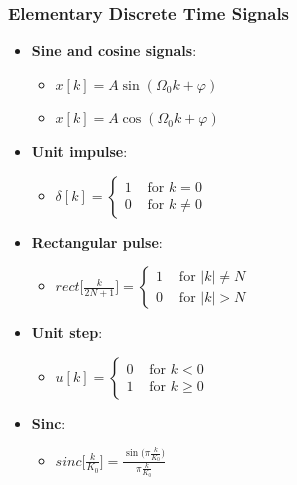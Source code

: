 \documentclass{article}
\begin{document}
\subsubsection{Elementary Discrete Time Signals}
\begin{itemize}
    \item \textbf{Sine and cosine signals}: 
    \begin{itemize}
        \item $x[k] = A\sin(\Omega_0 k + \varphi)$
        \item $x[k] = A\cos(\Omega_0 k + \varphi)$
    \end{itemize}
    \item \textbf{Unit impulse}: 
    \begin{itemize}
        \item $\delta[k] = \left\{\begin{array}{ll} 1 & \text{ for } k=0 \\ 0 & \text{ for } k \neq 0 \end{array}\right.$
    \end{itemize}
    \item \textbf{Rectangular pulse}: 
    \begin{itemize}
        \item $rect\Big[\frac{k}{2N+1}\Big] = \left\{\begin{array}{ll} 1 & \text{ for } |k| \neq N \\ 0 & \text{ for } |k| > N \end{array}\right.$
    \end{itemize}
    \item \textbf{Unit step}: 
    \begin{itemize}
        \item $u[k] = \left\{\begin{array}{ll} 0 & \text{ for } k < 0 \\ 1 & \text{ for } k \geq 0 \end{array}\right.$
    \end{itemize}
    \item \textbf{Sinc}: 
    \begin{itemize}
        \item $sinc\Big[\frac{k}{K_0}\Big] = \frac{\sin\big(\pi\frac{k}{K_0}\big)}{\pi\frac{k}{K_0}}$
    \end{itemize}
\end{itemize}
\end{document}

